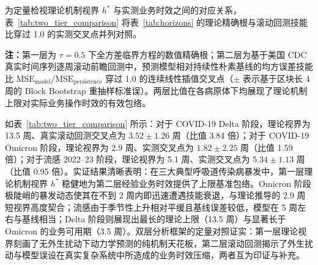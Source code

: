 \documentclass[11pt,a4paper]{article}
\theoremstyle{plain}
\theoremstyle{definition}
\begin{document}
为定量检视理论机制视界 $h^*$ 与实测业务时效之间的对应关系，表~\ref{tab:two_tier_comparison} 将表~\ref{tab:horizons} 的理论精确根与滚动回测技能比穿过 1.0 的实测交叉点并列对照。

\begin{table}[htbp]
\centering
\footnotesize
\caption{传染病理论机制可预测视界与伪实时滚动实测业务时效的双层对照}
\label{tab:two_tier_comparison}
\vspace{2pt}
\begin{flushleft}
\scriptsize \textbf{注：}第一层为 $\tau = 0.5$ 下全方差临界方程的数值精确根；第二层为基于美国 CDC 真实时间序列逐周滚动前瞻回测中，预测模型相对持续性朴素基线的均方误差技能比 $\text{MSE}_{\text{model}}/\text{MSE}_{\text{persistence}}$ 穿过 1.0 的连续线性插值交叉点（$\pm$ 表示基于区块长 4 周的 Block Bootstrap 重抽样标准误）。两层比值在各病原体下均展现了理论机制上限对实际业务操作时效的有效包络。
\end{flushleft}
\end{table}

如表~\ref{tab:two_tier_comparison} 所示：对于 COVID-19 Delta 阶段，理论视界为 13.5 周、真实滚动回测交叉点为 $3.52 \pm 1.26$ 周（比值 3.84 倍）；对于 COVID-19 Omicron 阶段，理论视界为 2.9 周、实测交叉点为 $1.82 \pm 2.25$ 周（比值 1.59 倍）；对于流感 2022--23 阶段，理论视界为 5.1 周、实测交叉点为 $5.34 \pm 1.13$ 周（比值 0.95 倍）。实证结果清晰表明：在三大典型呼吸道传染病暴发中，第一层理论机制视界 $h^*$ 稳健地为第二层经验业务时效提供了上限基准包络。Omicron 阶段极陡峭的暴发动态使其在不到 2 周内即迅速遭遇技能衰退，与理论推导的 2.9 周短视界高度契合；流感由于季节性上升相对平缓且基线误差较低，模型在 5 周左右与基线相当；Delta 阶段则展现出最长的理论上限（13.5 周）与显著长于 Omicron 的业务可用期（3.5 周）。双层分析框架的定量对照证实：第一层理论视界刻画了无外生扰动下动力学预测的纯机制天花板，第二层滚动回测揭示了外生扰动与模型误设在真实复杂系统中所造成的业务时效压缩，两者互为印证与补充。
\end{document}
